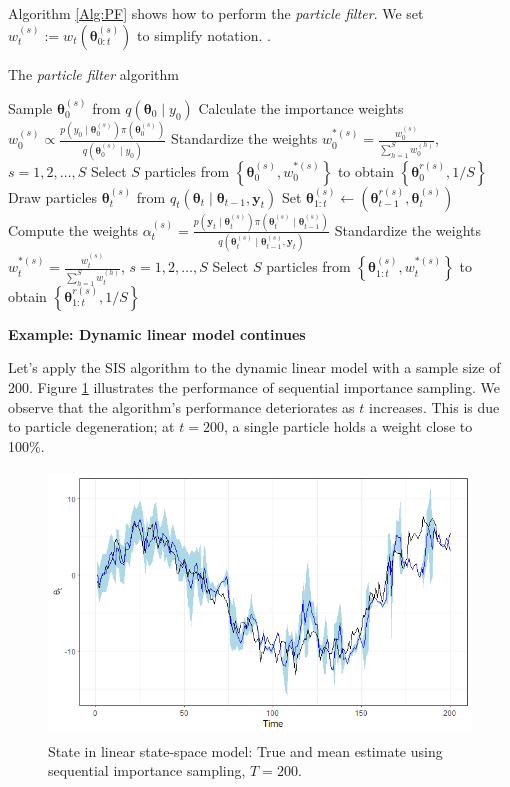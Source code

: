 Algorithm \ref{Alg:PF} shows how to perform the \textit{particle filter}. We set $w_t^{(s)}:=w_t(\bm{\theta}_{0:t}^{(s)})$ to simplify notation. \cite{doucet2009tutorial}.\\
\begin{algorithm}[h!]
	\caption{The \textit{particle filter} algorithm}\label{Alg:PF}
	\begin{algorithmic}[1]
		\State Sample $\bm{\theta}_0^{(s)}$ from $q(\bm{\theta}_0\mid y_0)$
		\State Calculate the importance weights $w_0^{(s)}\propto\frac{p(y_0\mid \bm{\theta}_0^{(s)})\pi(\bm{\theta}_0^{(s)})}{q(\bm{\theta}_0^{(s)}\mid y_0)}$
		\EndFor
		\State Standardize the weights $w_0^{*(s)}=\frac{w_0^{(s)}}{\sum_{h=1}^Sw_0^{(h)}}$, $s=1,2,\dots,S$
		\State Select $S$ particles from $\left\{\bm{\theta}_0^{(s)},w_0^{*(s)}\right\}$ to obtain $\left\{\bm{\theta}_0^{r(s)},1/S\right\}$  
		\State Draw particles $\bm{\theta}_t^{(s)}$ from $q_t(\bm{\theta}_t\mid \bm{\theta}_{t-1}, \bm{y}_t)$
		\State Set $\bm{\theta}_{1:t}^{(s)}\leftarrow (\bm{\theta}_{t-1}^{r(s)},\bm{\theta}_{t}^{(s)})$ 
		\State Compute the weights $\alpha_t^{(s)}=\frac{p(\bm{y}_{t}\mid \bm{\theta}_{t}^{(s)})\pi(\bm{\theta}_{t}^{(s)}\mid \bm{\theta}_{t-1}^{(s)})}{q(\bm{\theta}_t^{(s)}\mid \bm{\theta}_{t-1}^{(s)},\bm{y}_{t})}$		
		\EndFor
		\State Standardize the weights $w_t^{*(s)}=\frac{w_t^{(s)}}{\sum_{h=1}^Sw_t^{(h)}}$, $s=1,2,\dots,S$ 
		\State Select $S$ particles from $\left\{\bm{\theta}_{1:t}^{(s)},w_t^{*(s)}\right\}$ to obtain $\left\{\bm{\theta}_{1:t}^{r(s)},1/S\right\}$  
		\EndFor
	\end{algorithmic} 
\end{algorithm}

\textbf{Example: Dynamic linear model continues}

Let's apply the SIS algorithm to the dynamic linear model with a sample size of 200. Figure \ref{fig59} illustrates the performance of sequential importance sampling. We observe that the algorithm's performance deteriorates as $t$ increases. This is due to particle degeneration; at $t=200$, a single particle holds a weight close to 100\%.

\begin{figure}[!h]
	\includegraphics[width=340pt, height=200pt]{Chapters/chapter5/figures/SIS200.png}
	\caption[List of figure caption goes here]{State in linear state-space model: True and mean estimate using sequential importance sampling, $T=200$.}\label{fig59}
\end{figure} 

